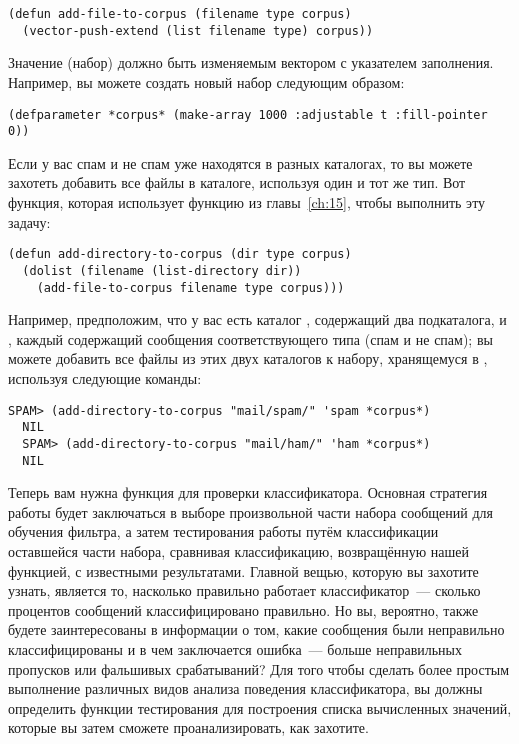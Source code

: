 \begin{lstlisting}
(defun add-file-to-corpus (filename type corpus)
  (vector-push-extend (list filename type) corpus))
\end{lstlisting}

Значение  (набор) должно быть изменяемым вектором с указателем заполнения.
Например, вы можете создать новый набор следующим образом:

\begin{lstlisting}
(defparameter *corpus* (make-array 1000 :adjustable t :fill-pointer 0))
\end{lstlisting}

Если у вас спам и не спам уже находятся в разных каталогах, то вы можете захотеть добавить
все файлы в каталоге, используя один и тот же тип.  Вот функция, которая использует функцию
 из главы~\ref{ch:15}, чтобы выполнить эту задачу:

\begin{lstlisting}
(defun add-directory-to-corpus (dir type corpus)
  (dolist (filename (list-directory dir))
    (add-file-to-corpus filename type corpus)))
\end{lstlisting}

Например, предположим, что у вас есть каталог , содержащий два подкаталога,
 и , каждый содержащий сообщения соответствующего типа (спам и
не спам); вы можете добавить все файлы из этих двух каталогов к набору, хранящемуся в
, используя следующие команды:

\begin{lstlisting}[style=lisprepl]
  SPAM> (add-directory-to-corpus "mail/spam/" 'spam *corpus*)
  NIL
  SPAM> (add-directory-to-corpus "mail/ham/" 'ham *corpus*)
  NIL
\end{lstlisting}

Теперь вам нужна функция для проверки классификатора.  Основная стратегия работы будет
заключаться в выборе произвольной части набора сообщений для обучения фильтра, а затем
тестирования работы путём классификации оставшейся части набора, сравнивая классификацию,
возвращённую нашей функцией, с известными результатами.  Главной вещью, которую вы захотите
узнать, является то, насколько правильно работает классификатор~--- сколько процентов
сообщений классифицировано правильно.  Но вы, вероятно, также будете заинтересованы в
информации о том, какие сообщения были неправильно классифицированы и в чем заключается
ошибка~--- больше неправильных пропусков или фальшивых срабатываний?  Для того чтобы
сделать более простым выполнение различных видов анализа поведения классификатора, вы
должны определить функции тестирования для построения списка вычисленных значений,
которые вы затем сможете проанализировать, как захотите.

